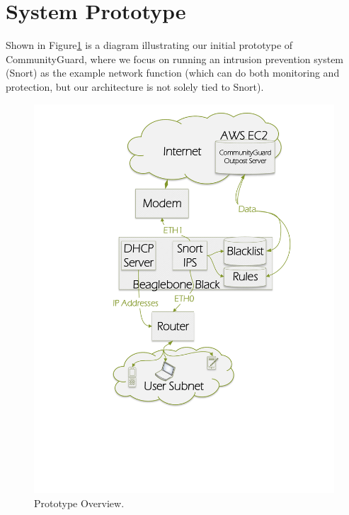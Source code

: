 \section{System Prototype}
\label{sec:design}

Shown in Figure\ref{fig:proto} is a diagram illustrating our initial prototype of CommunityGuard, where we focus on running an intrusion prevention system (Snort) as the example network function (which can do both monitoring and protection, but our architecture is not solely tied to Snort).  



\begin{figure}
    \centering
    \includegraphics[width=0.68\columnwidth]{figs/microarch.pdf}
    \caption{Prototype Overview.}
    \label{fig:proto}
\end{figure}

